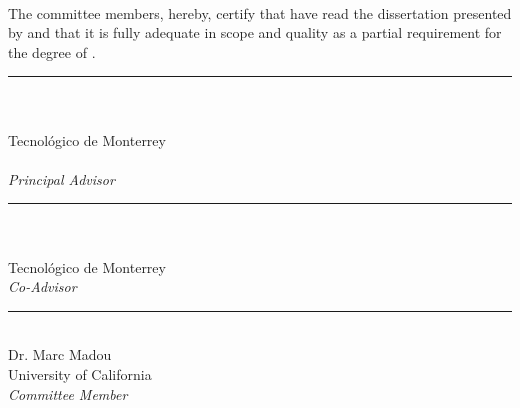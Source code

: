 \documentclass[
11pt, 
oneside,
english,
onehalfspacing,
onehalfspacing,
parskip,
headsepline,
]{MastersDoctoralThesis}
\begin{document}
\begin{titlepage}
\begin{center}
\vfill

\examDate\\[4cm]
 
\vfill
\end{center}
\end{titlepage}


%

\begin{committee}
The committee members, hereby, certify that have read the dissertation presented by \authorname \text{ } and that it is fully adequate in scope and quality as a partial requirement for the degree of \degreename.

\begin{flushright} \large

\bigskip
\bigskip
\medskip

\noindent \rule[0.0em]{15em}{0.5pt}\\ %
\supname\\
Tecnológico de Monterrey\\
\deptname\\
\emph{Principal Advisor}

\bigskip
\bigskip
\medskip

\noindent \rule[0.0em]{15em}{0.5pt}\\ %
\cosupname\\
Tecnológico de Monterrey\\
\emph{Co-Advisor}

\bigskip
\bigskip
\medskip

\noindent \rule[0.0em]{15em}{0.5pt}\\ %
Dr. Marc Madou\\
University of California\\
\emph{Committee Member}

\bigskip
\bigskip
\medskip


\end{flushright}
\end{committee}
\end{document}

